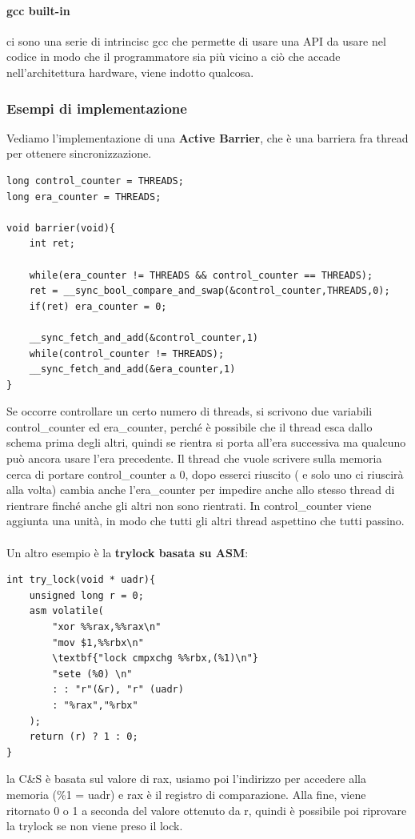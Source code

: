 \documentclass[12pt, oneside]{extbook}
\begin{document}
\paragraph{gcc built-in}ci sono una serie di intrincisc gcc che permette di usare una API da usare nel codice in modo che il programmatore sia più vicino a ciò che accade nell'architettura hardware, viene indotto qualcosa.
\subsubsection{Esempi di implementazione}
Vediamo l'implementazione di una \textbf{Active Barrier}, che è una barriera fra thread per ottenere sincronizzazione. 
\begin{lstlisting}
long control_counter = THREADS;
long era_counter = THREADS;

void barrier(void){
	int ret;
	
	while(era_counter != THREADS && control_counter == THREADS);
	ret = __sync_bool_compare_and_swap(&control_counter,THREADS,0);
	if(ret) era_counter = 0;
	
	__sync_fetch_and_add(&control_counter,1)
	while(control_counter != THREADS);
	__sync_fetch_and_add(&era_counter,1)
}
\end{lstlisting}
Se occorre controllare un certo numero di threads, si scrivono due variabili control\_counter ed era\_counter, perché è possibile che il thread esca dallo schema prima degli altri, quindi se rientra si porta all'era successiva ma qualcuno può ancora usare l'era precedente. Il thread che vuole scrivere sulla memoria cerca di portare control\_counter a 0, dopo esserci riuscito ( e solo uno ci riuscirà alla volta) cambia anche l'era\_counter per impedire anche allo stesso thread di rientrare finché anche gli altri non sono rientrati. In control\_counter viene aggiunta una unità, in modo che tutti gli altri thread aspettino che tutti passino.\\\\ 
Un altro esempio è la \textbf{trylock basata su ASM}:\\
\begin{lstlisting}
int try_lock(void * uadr){
	unsigned long r = 0;
	asm volatile(
		"xor %%rax,%%rax\n"
		"mov $1,%%rbx\n"
		\textbf{"lock cmpxchg %%rbx,(%1)\n"}
		"sete (%0) \n"
		: : "r"(&r), "r" (uadr)
		: "%rax","%rbx"	
	);
	return (r) ? 1 : 0;
}
\end{lstlisting}
la C\&S è basata sul valore di rax, usiamo poi l'indirizzo per accedere alla memoria (\%1 = uadr) e rax è il registro di comparazione. Alla fine, viene ritornato 0 o 1 a seconda del valore ottenuto da r, quindi è possibile poi riprovare la trylock se non viene preso il lock.
\end{document}
